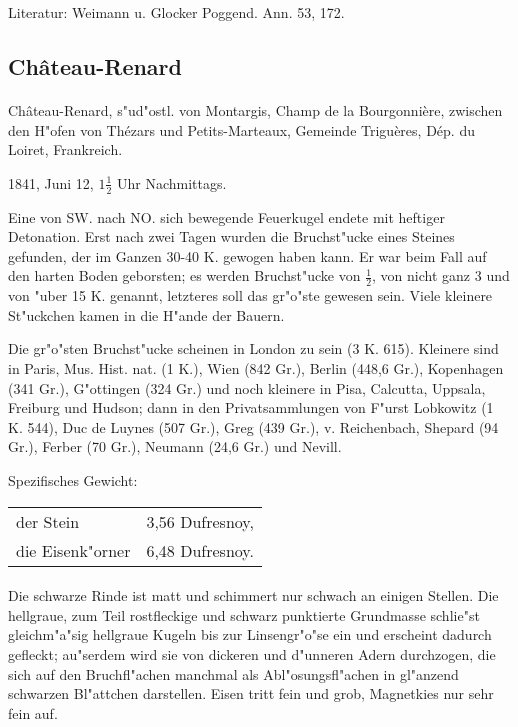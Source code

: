 \documentclass[a4paper, 11pt, oneside]{article}
\begin{document}
\footnotesize
Literatur: Weimann u. Glocker Poggend. Ann. 53, 172.

\subsection{Château-Renard}
\normalsize
\paragraph{}
Château-Renard, s"ud"ostl. von Montargis, Champ de la Bourgonnière, zwischen den H"ofen von Thézars und Petits-Marteaux, Gemeinde Triguères, Dép. du Loiret, Frankreich.

1841, Juni 12, $1\frac{1}{2}$ Uhr Nachmittags.

Eine von SW. nach NO. sich bewegende Feuerkugel endete mit heftiger Detonation. Erst nach zwei Tagen wurden die Bruchst"ucke eines Steines gefunden, der im Ganzen 30-40 K. gewogen haben kann. Er war beim Fall auf den harten Boden geborsten; es werden Bruchst"ucke von $\frac{1}{2}$, von nicht ganz 3 und von "uber 15 K. genannt, letzteres soll das gr"o"ste gewesen sein. Viele kleinere St"uckchen kamen in die H"ande der Bauern.

Die gr"o"sten Bruchst"ucke scheinen in London zu sein (3 K. 615). Kleinere sind in Paris, Mus. Hist. nat. (1 K.), Wien (842 Gr.), Berlin (448,6 Gr.), Kopenhagen (341 Gr.), G"ottingen (324 Gr.) und noch kleinere in Pisa, Calcutta, Uppsala, Freiburg und Hudson; dann in den Privatsammlungen von F"urst Lobkowitz (1 K. 544), Duc de Luynes (507 Gr.), Greg (439 Gr.), v. Reichenbach, Shepard (94 Gr.), Ferber (70 Gr.), Neumann (24,6 Gr.) und Nevill.

Spezifisches Gewicht:  
\begin{table}[!ht]
    \centering
    \begin{tabular}{l l}
        der Stein & 3,56 Dufresnoy,\\
        die Eisenk"orner & 6,48 Dufresnoy.
    \end{tabular}
\end{table}
\paragraph{}
Die schwarze Rinde ist matt und schimmert nur schwach an einigen Stellen. Die hellgraue, zum Teil rostfleckige und schwarz punktierte Grundmasse schlie"st gleichm"a"sig hellgraue Kugeln bis zur Linsengr"o"se ein und erscheint dadurch gefleckt; au"serdem wird sie von dickeren und d"unneren Adern durchzogen, die sich auf den Bruchfl"achen manchmal als Abl"osungsfl"achen in gl"anzend schwarzen Bl"attchen darstellen. Eisen tritt fein und grob, Magnetkies nur sehr fein auf.
\end{document}
